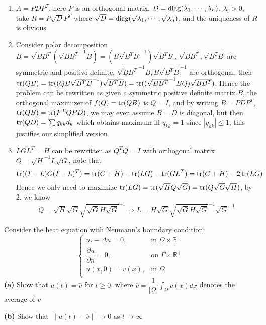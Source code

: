 \documentclass[main]{subfiles}
\begin{document}
\begin{solution}
\begin{enumerate}[leftmargin=*,label=\textbf{\arabic*.}]
\item $A=PDP^T$, here $P$ is an orthogonal matrix, $D=\operatorname{diag}(\lambda_1,\cdots,\lambda_n)$, $\lambda_i>0$, take $R=P\sqrt{D}P^T$ where $\sqrt D=\operatorname{diag}(\sqrt{\lambda_1},\cdots,\sqrt{\lambda_n})$, and the uniqueness of $R$ is obvious
\item Consider polar decomposition $B=\sqrt{BB^T}(\sqrt{BB^T}^{-1}B)=(B\sqrt{B^TB}^{-1})\sqrt{B^TB}$, $\sqrt{BB^T},\sqrt{B^TB}$ are symmetric and positive definite, $\sqrt{BB^T}^{-1}B,B\sqrt{B^TB}^{-1}$ are orthogonal, then $\operatorname{tr}(QB)=\operatorname{tr}((QB\sqrt{B^TB}^{-1})\sqrt{B^TB})=\operatorname{tr}((\sqrt{BB^T}^{-1}BQ)\sqrt{BB^T})$. Hence the problem can be rewritten as given a symmetric positive definite matrix $B$, the orthogonal maximizer of $f(Q)=\operatorname{tr}(QB)$ is $Q=I$, and by writing $B=PDP^T$, $\operatorname{tr}(QB)=\operatorname{tr}(P^TQPD)$, we may even assume $B=D$ is diagonal, but then $\operatorname{tr}(QD)=\sum q_{kk}d_k$ which obtains maximum iff $q_{kk}=1$ since $|q_{kk}|\leq1$, this justifies our simplified version
\item $LGL^T=H$ can be rewritten as $Q^TQ=I$ with orthogonal matrix $Q=\sqrt{H}^{-1}L\sqrt{G}$, note that
\[\operatorname{tr}((I-L)G(I-L)^T)=\operatorname{tr}(G+H)-\operatorname{tr}(LG)-\operatorname{tr}(GL^T)=\operatorname{tr}(G+H)-2\operatorname{tr}(LG)\]
Hence we only need to maximize $\operatorname{tr}(LG)=\operatorname{tr}(\sqrt{H}Q\sqrt{G})=\operatorname{tr}(Q\sqrt{G}\sqrt{H})$, by 2. we know
\[Q=\sqrt{H}\sqrt{G}\sqrt{\sqrt{G}H\sqrt{G}}^{-1}\Rightarrow L=H\sqrt{G}\sqrt{\sqrt{G}H\sqrt{G}}^{-1}\sqrt{G}^{-1}\]
\end{enumerate}
\end{solution}

\begin{exercise} Consider the heat equation with Neumann's boundary condition:
\[\begin{cases}
u_t-\Delta u=0, &\text{in }\Omega\times\mathbb R^+ \\
\dfrac{\partial u}{\partial n}=0, &\text{on }\Gamma\times\mathbb R^+ \\
u(x,0)=v(x), &\text{in }\Omega \\
\end{cases}\]
\textbf{(a) }Show that $\overline{u(t)}=\overline v$ for $t\geq0$, where $\displaystyle\overline v=\dfrac{1}{|\Omega|}\int_{\Omega}v(x)dx$ denotes the average of $v$ \par
\textbf{(b) }Show that $\|u(t)-\overline v\|\to0$ as $t\to\infty$
\end{exercise}
\end{document}
